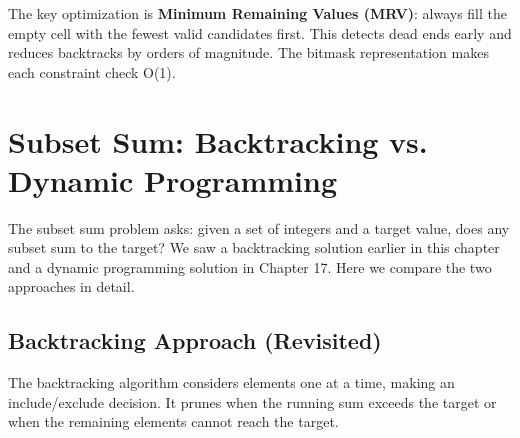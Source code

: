 The key optimization is \textbf{Minimum Remaining Values (MRV)}: always fill the empty cell with the fewest valid candidates first. This detects dead ends early and reduces backtracks by orders of magnitude. The bitmask representation makes each constraint check O(1).

\section{Subset Sum: Backtracking vs. Dynamic Programming}\label{sec:subset-sum-backtrack}

The subset sum problem asks: given a set of integers and a target value, does any subset sum to the target? We saw a backtracking solution earlier in this chapter and a dynamic programming solution in Chapter 17. Here we compare the two approaches in detail.

\subsection{Backtracking Approach (Revisited)}

The backtracking algorithm considers elements one at a time, making an include/exclude decision. It prunes when the running sum exceeds the target or when the remaining elements cannot reach the target.

